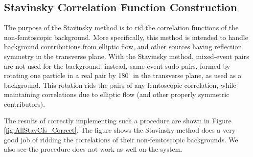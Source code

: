 \documentclass[../AnalysisNoteJBuxton.tex]{subfiles}
\begin{document}
\subsection{Stavinsky Correlation Function Construction}
\label{StavCfConstruction}

The purpose of the Stavinsky method is to rid the correlation functions of the non-femtoscopic background.  More specifically, this method is intended to handle background contributions from elliptic flow, and other sources having reflection symmetry in the transverse plane.  With the Stavinsky method, mixed-event pairs are not used for the background; instead, same-event sudo-pairs, formed by rotating one particle in a real pair by 180$^\circ$ in the transverse plane, as used as a background.  This rotation rids the pairs of any femtoscopic correlation, while maintaining correlations due to elliptic flow (and other properly symmetric contributors).

The results of correctly implementing such a procedure are shown in Figure \ref{fig:AllStavCfs_Correct}.  The figure shows the Stavinsky method does a very good job of ridding the \LamKpm correlations of their non-femtoscopic backgrounds.  We also see the procedure does not work as well on the \LamKs system.
\end{document}
